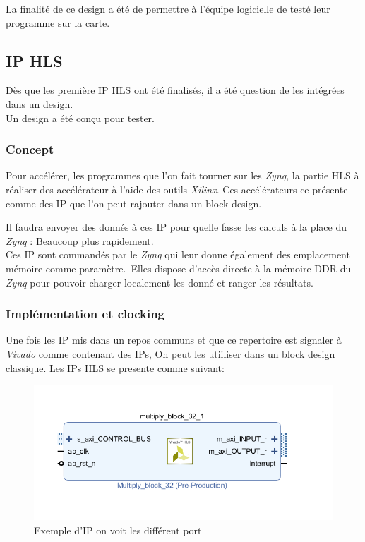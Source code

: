 \documentclass[12pt,a4paper]{ieee}
\begin{document}
La finalité de ce design a été de permettre à l'équipe logicielle de testé leur programme sur la carte.
\subsection{IP HLS}
Dès que les première IP HLS ont été finalisés, il a été question de les intégrées dans un design.\\
Un design a été conçu pour tester.
\subsubsection{Concept}
Pour accélérer, les programmes que l'on fait tourner sur les \textit{Zynq}, la partie HLS à réaliser des accélérateur à l'aide des outils \textit{Xilinx}. Ces accélérateurs ce présente comme des IP que l'on peut rajouter dans un block design.

Il faudra envoyer des donnés à ces IP pour quelle fasse les calculs à la place du \textit{Zynq} : Beaucoup plus rapidement.\\

Ces IP sont commandés par le \textit{Zynq} qui leur donne également des emplacement mémoire comme paramètre.\
Elles dispose d'accès directe à la mémoire DDR du \textit{Zynq} pour pouvoir charger localement les donné et ranger les résultats.\\

\subsubsection{Implémentation et clocking}
Une fois les IP mis dans un repos communs et que ce repertoire est signaler à \textit{ Vivado} comme contenant des IPs, On peut les utiiliser dans un block design classique.
\subsubsubsection{Relier les IP aux Zynq}
Les IPs HLS se presente comme suivant:
\begin{figure}[H]
	\centering
		\includegraphics[width=\linewidth]{im/ip1.png}	
	\caption{Exemple d'IP on voit les différent port}
	\label{fig-ip1}
\end{figure}
\end{document}
